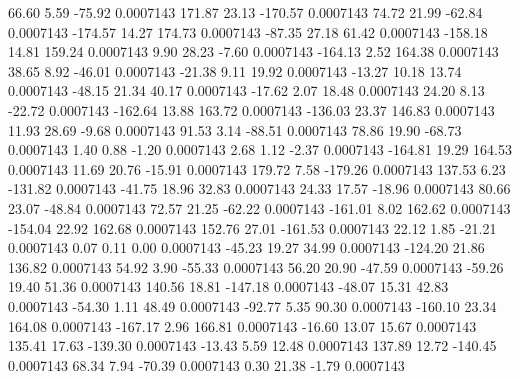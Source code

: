        66.60        5.59      -75.92     0.0007143
      171.87       23.13     -170.57     0.0007143
       74.72       21.99      -62.84     0.0007143
     -174.57       14.27      174.73     0.0007143
      -87.35       27.18       61.42     0.0007143
     -158.18       14.81      159.24     0.0007143
        9.90       28.23       -7.60     0.0007143
     -164.13        2.52      164.38     0.0007143
       38.65        8.92      -46.01     0.0007143
      -21.38        9.11       19.92     0.0007143
      -13.27       10.18       13.74     0.0007143
      -48.15       21.34       40.17     0.0007143
      -17.62        2.07       18.48     0.0007143
       24.20        8.13      -22.72     0.0007143
     -162.64       13.88      163.72     0.0007143
     -136.03       23.37      146.83     0.0007143
       11.93       28.69       -9.68     0.0007143
       91.53        3.14      -88.51     0.0007143
       78.86       19.90      -68.73     0.0007143
        1.40        0.88       -1.20     0.0007143
        2.68        1.12       -2.37     0.0007143
     -164.81       19.29      164.53     0.0007143
       11.69       20.76      -15.91     0.0007143
      179.72        7.58     -179.26     0.0007143
      137.53        6.23     -131.82     0.0007143
      -41.75       18.96       32.83     0.0007143
       24.33       17.57      -18.96     0.0007143
       80.66       23.07      -48.84     0.0007143
       72.57       21.25      -62.22     0.0007143
     -161.01        8.02      162.62     0.0007143
     -154.04       22.92      162.68     0.0007143
      152.76       27.01     -161.53     0.0007143
       22.12        1.85      -21.21     0.0007143
        0.07        0.11        0.00     0.0007143
      -45.23       19.27       34.99     0.0007143
     -124.20       21.86      136.82     0.0007143
       54.92        3.90      -55.33     0.0007143
       56.20       20.90      -47.59     0.0007143
      -59.26       19.40       51.36     0.0007143
      140.56       18.81     -147.18     0.0007143
      -48.07       15.31       42.83     0.0007143
      -54.30        1.11       48.49     0.0007143
      -92.77        5.35       90.30     0.0007143
     -160.10       23.34      164.08     0.0007143
     -167.17        2.96      166.81     0.0007143
      -16.60       13.07       15.67     0.0007143
      135.41       17.63     -139.30     0.0007143
      -13.43        5.59       12.48     0.0007143
      137.89       12.72     -140.45     0.0007143
       68.34        7.94      -70.39     0.0007143
        0.30       21.38       -1.79     0.0007143
